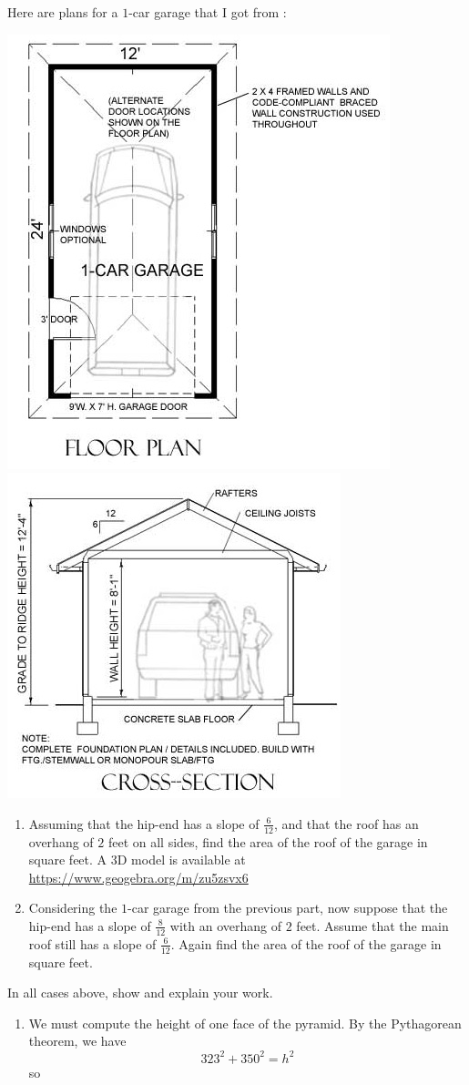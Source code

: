 \documentclass[hints,nooutcomes,noauthor,handout]{ximera}
\begin{document}
 \begin{question}
  Here are plans for a $1$-car garage that I got from :
   \begin{center}
     \includegraphics[width=.4\textwidth]{oneCarGarage.jpeg}
    \includegraphics[width=.35\textwidth]{oneCarGarageFront.jpeg}
   \end{center}
   \begin{enumerate}
\item Assuming that the hip-end has a slope of $\tfrac{6}{12}$, and
  that the roof has an overhang of $2$ feet on all sides, find the
  area of the roof of the garage in square feet. A 3D model is
  available at \url{https://www.geogebra.org/m/zu5zsvx6}
 \item Considering the $1$-car garage from the previous part, now
   suppose that the hip-end has a slope of $\tfrac{8}{12}$ with an
   overhang of $2$ feet. Assume that the main roof still has a slope of $\tfrac{6}{12}$. Again find the area of the roof of the
   garage in square feet.
\end{enumerate}
In all cases above, show and explain your work.
\begin{freeResponse}
  \begin{enumerate}
    \item We must compute the height of one face of the pyramid. By
      the Pythagorean theorem, we have
      \[
      323^2 + 350^2 = h^2
      \]
      so

\end{enumerate}
\end{freeResponse}
\end{question}
\end{document}
